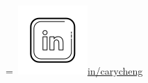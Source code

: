 \documentclass[]{plushcv}
\begin{document}
\begin{minipage}[t]{0.25\textwidth}
\begingroup
{}=\hbox{
\includegraphics[scale=0.1,trim={0 1.25cm -0.4cm 0cm}]{icons/main/linkedin.png}\hspace{0.3cm}\href{https://www.linkedin.com/in/carycheng/}{in/carycheng}
}
\parbox{\wd0}{}
\endgroup






\end{minipage} 
\end{document}
